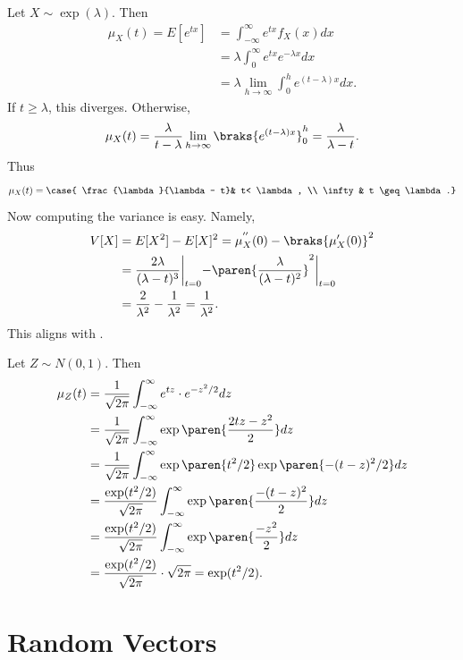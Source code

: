 \documentclass[11pt]{article}
\begin{document}
\begin{ex}
Let $X \sim \exp(\lambda)$. Then
\begin{align*}
    \mu_X(t)=E[e^{tx}] &=\int_{-\infty}^\infty e^{tx}f_X(x)dx \\
    &= \lambda \int _0^\infty e^{tx}e^{-\lambda x}dx
    \\ &= \lambda \lim_{h \to \infty}\int_0^h e^{(t-\lambda)x}dx.
\end{align*}
If $t \geq \lambda$, this diverges. Otherwise,
\[
\mu_X(t)=\frac{\lambda}{t-\lambda}\lim_{h \to \infty}\braks{e^{(t-\lambda)x}}_0^h= \frac{\lambda}{\lambda- t}.
\]
Thus
\[
\mu_X(t)= \case{ \frac{\lambda}{\lambda - t}& t< \lambda, \\ \infty & t \geq \lambda.}
\]
Now computing the variance is easy. Namely,
\begin{align*}
    V[X] &=E[X^2]-E[X]^2=\mu_X^{''}(0)-\braks{\mu_X'(0)}^2
    \\ &=\frac{2\lambda}{(\lambda-t)^3}\biggl |_{t=0}-\paren{\frac{\lambda}{(\lambda-t)^2}}^2 \biggl |_{t=0}
    \\ &= \frac{2}{\lambda ^2}-\frac{1}{\lambda ^2}=\frac{1}{\lambda^2}.
\end{align*}
This aligns with .
\end{ex}

\begin{ex}
Let $Z \sim N(0,1)$. Then
\begin{align*}
    \mu_Z(t) &=\frac{1}{\sqrt{2\pi}}\int_{-\infty}^\infty e^{tz}\cdot e^{-z^2/2}dz 
    \\ &= \frac{1}{\sqrt{2\pi}}\int_{-\infty}^\infty \exp\paren{ \frac{2tz-z^2}{2}}dz
    \\ &= \frac{1}{\sqrt {2\pi}}\int _{-\infty}^\infty \exp\paren{t^2/2}\exp\paren{-(t-z)^2/2}dz
    \\ &= \frac{\exp(t^2/2)}{\sqrt{2\pi}}\int_{-\infty}^\infty \exp\paren{\frac{-(t-z)^2}{2}}dz
    \\ &= \frac{\exp(t^2/2)}{\sqrt{2\pi}}\int_{-\infty}^\infty \exp\paren{\frac{-z^2}{2}}dz
    \\ &= \frac{\exp(t^2/2)}{\sqrt{2\pi}}\cdot \sqrt{2\pi}=\exp(t^2/2).
\end{align*}
\end{ex}

\section{Random Vectors}
\end{document}
